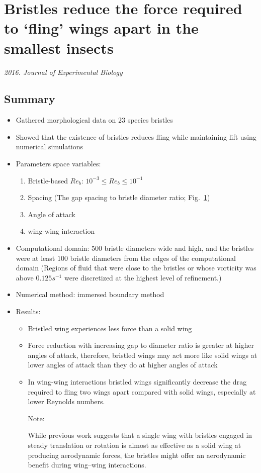 \documentclass[preprint, letterpaper, nobibnotes, aps, superscriptaddress,prb]{revtex4-1}
\begin{document}
\clearpage

\section{Bristles reduce the force required to ‘fling’ wings apart in the smallest insects}

\textit{2016. Journal of Experimental Biology}

\subsection{Summary}
\begin{itemize}
\item
Gathered morphological data on 23 species bristles
\item 
Showed that the existence of bristles reduces fling while maintaining lift using numerical simulations
\item
Parameters space variables: 
\begin{enumerate}
\item 
Bristle-based $Re_{b}$: $10^{−3}\leq Re_b \leq 10^{−1}$
\item 
Spacing (The gap spacing to bristle diameter ratio; Fig.~\ref{fig2})
\begin{figure}[H]
  \centering {}
  \caption{}\label{fig2}
\end{figure}

\item 
Angle of attack
\item 
wing-wing interaction
\end{enumerate}
\item
Computational domain: 500 bristle diameters wide and high, and the bristles were at least $100$ bristle diameters from the edges of the computational domain (Regions of fluid that were close to the bristles or whose vorticity was above $0.125 s^{−1}$ were discretized at the highest level of refinement.)
\item
Numerical method: immersed boundary method
\item
Results: 
\begin{itemize}
\item Bristled wing experiences less force than a solid wing
\item Force reduction with increasing gap to diameter ratio is greater at higher angles of attack, therefore, bristled wings may act more like solid wings at lower angles of attack than they do at higher angles of attack 
\item In wing-wing interactions bristled wings significantly decrease the drag required to fling two wings apart compared with solid wings, especially at lower Reynolds numbers.

Note:

While previous work suggests that a single wing with bristles engaged in steady translation or rotation is almost as effective as a solid wing at producing aerodynamic forces, the bristles might offer an aerodynamic benefit during wing–wing interactions.
\end{itemize}
\end{itemize}
\end{document}
